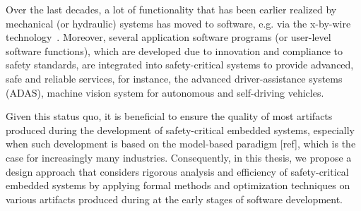 Over the last decades, a lot of functionality that has been earlier realized by mechanical (or hydraulic) systems has moved to software, e.g. via the x-by-wire technology~\cite{Navet2010DesignSystems}. Moreover, several application software programs (or user-level software functions), which are developed due to innovation and compliance to safety standards, are integrated into safety-critical systems to provide advanced, safe and reliable services, for instance, the advanced driver-assistance systems (ADAS), machine vision system for autonomous and self-driving vehicles. %


Given this status quo, it is beneficial to ensure the quality of most artifacts produced during the development of safety-critical embedded systems, especially when such development is based on the model-based paradigm [ref], which is the case for increasingly many industries.  Consequently, in this thesis, we propose a design approach that considers rigorous analysis and efficiency of safety-critical embedded systems by applying formal methods and optimization techniques on various artifacts produced during at the early stages of software development.
 
